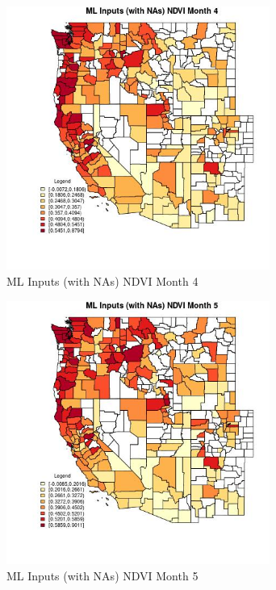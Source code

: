 \begin{figure} 
\centering  
\includegraphics[width=0.77\textwidth]{Code_Outputs/Report_ML_input_PM25_Step4_part_f_de_duplicated_aveswNAs_CountyNDVImedianMonth4.jpg} 
\caption{\label{fig:Report_ML_input_PM25_Step4_part_f_de_duplicated_aveswNAsCountyNDVImedianMonth4}ML Inputs (with NAs) NDVI Month 4} 
\end{figure} 
 

\clearpage 

\begin{figure} 
\centering  
\includegraphics[width=0.77\textwidth]{Code_Outputs/Report_ML_input_PM25_Step4_part_f_de_duplicated_aveswNAs_CountyNDVImedianMonth5.jpg} 
\caption{\label{fig:Report_ML_input_PM25_Step4_part_f_de_duplicated_aveswNAsCountyNDVImedianMonth5}ML Inputs (with NAs) NDVI Month 5} 
\end{figure} 
 

